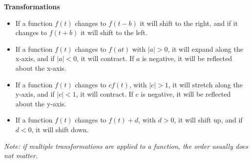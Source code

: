 \documentclass[nobib]{tufte-handout}
\begin{document}
\textbf{Transformations}
\begin{itemize}
    \item If a function $f(t)$ changes to $f(t-b)$ it will shift to the right, and if it
          changes to $f(t+b)$ it will shift to the left.
    \item If a function $f(t)$ changes to $f(at)$ with $|a| > 0$, it will expand along
          the x-axis, and if $|a| < 0$, it will contract. If $a$ is negative, it will be
          reflected about the x-axis.
    \item If a function $f(t)$ changes to $cf(t)$, with $|c| > 1$, it will stretch along
          the y-axis, and if $|c| < 1$, it will contract. If $c$ is negative, it will be
          reflected about the y-axis.
    \item If a function $f(t)$ changes to $f(t)+d$, with $d > 0$, it will shift up, and
          if $d < 0$, it will shift down.
\end{itemize}
\textit{Note: if multiple transformations are applied to a function, the order usually does not matter.}
\end{document}
